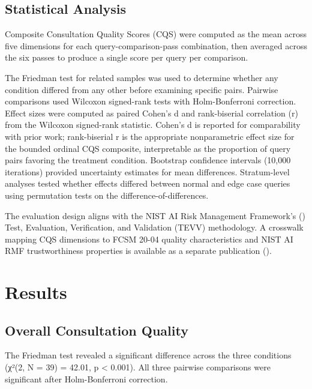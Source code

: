 \documentclass[
  11pt,
  letterpaper,
]{article}
\begin{document}
\subsection{Statistical Analysis}\label{statistical-analysis}

Composite Consultation Quality Scores (CQS) were computed as the mean
across five dimensions for each query-comparison-pass combination, then
averaged across the six passes to produce a single score per query per
comparison.

The Friedman test for related samples was used to determine whether any
condition differed from any other before examining specific pairs.
Pairwise comparisons used Wilcoxon signed-rank tests with
Holm-Bonferroni correction. Effect sizes were computed as paired Cohen's
d and rank-biserial correlation (r) from the Wilcoxon signed-rank
statistic. Cohen's d is reported for comparability with prior work;
rank-biserial r is the appropriate nonparametric effect size for the
bounded ordinal CQS composite, interpretable as the proportion of query
pairs favoring the treatment condition. Bootstrap confidence intervals
(10,000 iterations) provided uncertainty estimates for mean differences.
Stratum-level analyses tested whether effects differed between normal
and edge case queries using permutation tests on the
difference-of-differences.

The evaluation design aligns with the NIST AI Risk Management
Framework's () Test, Evaluation, Verification, and Validation
(TEVV) methodology. A crosswalk mapping CQS dimensions to FCSM 20-04
quality characteristics and NIST AI RMF trustworthiness properties is
available as a separate publication
().

\section{Results}\label{results}

\subsection{Overall Consultation
Quality}\label{overall-consultation-quality}

The Friedman test revealed a significant difference across the three
conditions (χ²(2, N = 39) = 42.01, p \textless{} 0.001). All three
pairwise comparisons were significant after Holm-Bonferroni correction.
\end{document}
